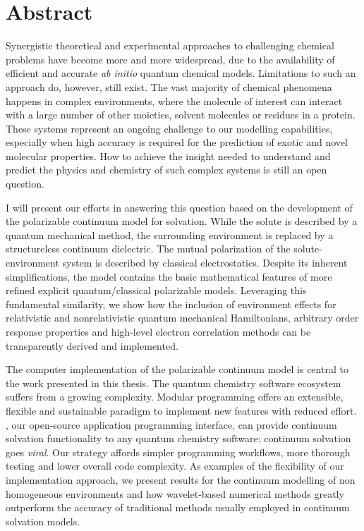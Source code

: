 \begingroup
\let\clearpage\relax
\let\cleardoublepage\relax
\let\cleardoublepage\relax

\chapter*{Abstract}

Synergistic theoretical and experimental approaches to challenging
chemical problems have become more and more widespread, due to the
availability of efficient and accurate \emph{ab initio} quantum chemical
models.
Limitations to such an approach do, however, still exist.
The vast majority of chemical phenomena happens in complex environments,
where the molecule of interest can interact with a large number of other
moieties, solvent molecules or residues in a protein.
These systems represent an ongoing challenge to our modelling
capabilities, especially when high accuracy is required for the
prediction of exotic and novel molecular properties.
How to achieve the insight needed to understand and predict the physics
and chemistry of such complex systems is still an open question.

I will present our efforts in answering this question based on the
development of the polarizable continuum model for solvation.
While the solute is described by a quantum mechanical method, the
surrounding environment is replaced by a structureless continuum
dielectric.
The mutual polarization of the solute-environment system is described by
classical electrostatics.
Despite its inherent simplifications, the model contains the basic
mathematical features of more refined explicit quantum/classical
polarizable models.
Leveraging this fundamental similarity, we show how the
inclusion of environment effects for relativistic and nonrelativistic
quantum mechanical Hamiltonians, arbitrary order response properties and
high-level electron correlation methods can be transparently derived and
implemented.

The computer implementation of the polarizable continuum model is
central to the work presented in this thesis.
The quantum chemistry software ecosystem suffers from a growing
complexity. Modular programming offers an extensible, flexible and
sustainable paradigm to implement new features with reduced effort.
\pcmsolver, our open-source application programming interface, can
provide continuum solvation functionality to any quantum chemistry
software: continuum solvation goes \emph{viral}.
Our strategy affords simpler programming workflows, more thorough
testing and lower overall code complexity.
As examples of the flexibility of our implementation approach, we
present results for the continuum modelling of non homogeneous
environments and how wavelet-based numerical methods greatly outperform
the accuracy of traditional methods usually employed in continuum
solvation models.


